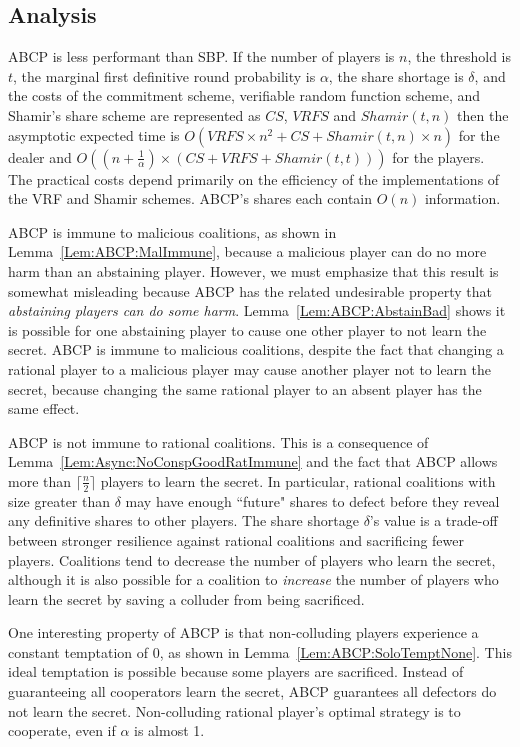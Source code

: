\documentclass[12pt]{dalcsthesis}
\begin{document}
\subsection{Analysis}

ABCP is less performant than SBP. If the number of players is $n$, the threshold is $t$, the marginal first definitive round probability is $\alpha$, the share shortage is $\delta$, and the costs of the commitment scheme, verifiable random function scheme, and Shamir's share scheme are represented as $CS$, $VRFS$ and $Shamir(t, n)$ then the asymptotic expected time is $O(VRFS  \times n^2 + CS + Shamir(t, n) \times n)$ for the dealer and $O((n + \frac{1}{\alpha}) \times (CS + VRFS + Shamir(t, t)))$ for the players. The practical costs depend primarily on the efficiency of the implementations of the VRF and Shamir schemes. ABCP's shares each contain $O(n)$ information.

ABCP is immune to malicious coalitions, as shown in Lemma~\ref{Lem:ABCP:MalImmune}, because a malicious player can do no more harm than an abstaining player. However, we must emphasize that this result is somewhat misleading because ABCP has the related undesirable property that \emph{abstaining players can do some harm}. Lemma~\ref{Lem:ABCP:AbstainBad} shows it is possible for one abstaining player to cause one other player to not learn the secret. ABCP is immune to malicious coalitions, despite the fact that changing a rational player to a malicious player may cause another player not to learn the secret, because changing the same rational player to an absent player has the same effect.

ABCP is not immune to rational coalitions. This is a consequence of Lemma~\ref{Lem:Async:NoConspGoodRatImmune} and the fact that ABCP allows more than $\lceil \frac{n}{2} \rceil$ players to learn the secret. In particular, rational coalitions with size greater than $\delta$ may have enough ``future" shares to defect before they reveal any definitive shares to other players. The share shortage $\delta$'s value is a trade-off between stronger resilience against rational coalitions and sacrificing fewer players. Coalitions tend to decrease the number of players who learn the secret, although it is also possible for a coalition to \emph{increase} the number of players who learn the secret by saving a colluder from being sacrificed.

One interesting property of ABCP is that non-colluding players experience a constant temptation of $0$, as shown in Lemma~\ref{Lem:ABCP:SoloTemptNone}. This ideal temptation is possible because some players are sacrificed. Instead of guaranteeing all cooperators learn the secret, ABCP guarantees all defectors do not learn the secret. Non-colluding rational player's optimal strategy is to cooperate, even if $\alpha$ is almost 1.
\end{document}
